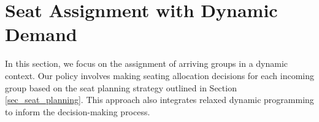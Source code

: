 \section{Seat Assignment with Dynamic Demand}\label{sec_dynamic}
In this section, we focus on the assignment of arriving groups in a dynamic context. Our policy involves making seating allocation decisions for each incoming group based on the seat planning strategy outlined in Section \ref{sec_seat_planning}. This approach also integrates relaxed dynamic programming to inform the decision-making process.





